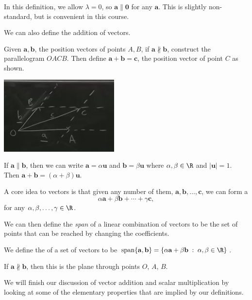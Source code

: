 \documentclass[a4]{scrreprt}
\begin{document}
In this definition, we allow $\lambda = 0$, so $\mathbf{a} \parallel \mathbf{0}$ for any $\mathbf{a}$. 
This is slightly non-standard, but is convenient in this course.

We can also define the addition of vectors.

\begin{definition}
	Given $\mathbf{a}, \mathbf{b}$, the position vectors of points $A, B$, if $\mathbf{a} \not\parallel \mathbf{b}$, construct the parallelogram $OACB$. Then define $\mathbf{a} + \mathbf{b} = \mathbf{c}$, the position vector of point $C$ as shown.
	\begin{center}
		\includegraphics[width=0.45\textwidth]{parallelogram.png}
	\end{center} 
	If $\mathbf{a} \parallel \mathbf{b}$, then we can write $\mathbf{a} = \alpha \mathbf{u}$ and $\mathbf{b} = \beta \mathbf{u}$ where $\alpha, \beta \in \R$ and $|\mathbf{u}| = 1$. Then $\mathbf{a} + \mathbf{b} = (\alpha + \beta) \mathbf{u}$.
\end{definition}

A core idea to vectors is that given any number of them, $\mathbf{a}, \mathbf{b}, \dots, \mathbf{c}$, we can form a 
$$
\alpha \mathbf{a} + \beta \mathbf{b} + \cdots + \gamma \mathbf{c},
$$
for any $\alpha, \beta, \dots, \gamma \in \R$.

We can then define the \emph{span} of a linear combination of vectors to be the set of points that can be reached by changing the coefficients.

\begin{definition}
	We define the  of a set of vectors to be $\operatorname{span} \{\mathbf{a}, \mathbf{b}\} = \{ \alpha \mathbf{a} + \beta \mathbf{b} \; : \; \alpha, \beta \in \R\}$.
\end{definition}
If $\mathbf{a} \not \parallel \mathbf{b}$, then this is the plane through points $O$, $A$, $B$.


We will finish our discussion of vector addition and scalar multiplication by looking at some of the elementary properties that are implied by our definitions.
\end{document}
